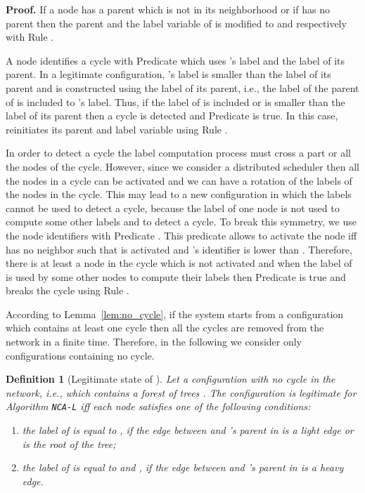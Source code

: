\documentclass[11pt,a4paper]{article}
\newtheorem{definition}{Definition}
\newenvironment{proof}{\noindent \begin{rm}{\textbf{Proof.} }}{\hspace*{\fill}\par\end{rm}}
\newcommand{\LabA}{\mbox{\tt NCA-L}}
\begin{document}
\begin{proof}
If a node  has a parent which is not in its neighborhood or if  has no parent then the parent and the label variable of  is modified to  and  respectively with Rule .

A node  identifies a cycle with Predicate  which uses 's label and the label of its parent. In a legitimate configuration, 's label is smaller than the label of its parent and is constructed using the label of its parent, i.e., the label of the parent of  is included to 's label. Thus, if the label of  is included or is smaller than the label of its parent then a cycle is detected and Predicate  is true. In this case,  reinitiates its parent and label variable using Rule .

In order to detect a cycle the label computation process must cross a part or all the nodes of the cycle. However, since we consider a distributed scheduler then all the nodes in a cycle can be activated and we can have a rotation of the labels of the nodes in the cycle. This may lead to a new configuration in which the labels cannot be used to detect a cycle, because the label of one node is not used to compute some other labels and to detect a cycle. To break this symmetry, we use the node identifiers with Predicate . This predicate allows to activate the node  iff  has no neighbor  such that  is activated and 's identifier is lower than . Therefore, there is at least a node  in the cycle which is not activated and when the label of  is used by some other nodes to compute their labels then Predicate  is true and  breaks the cycle using Rule .
\end{proof}


According to Lemma~\ref{lem:no_cycle}, if the system starts from a configuration which contains at least one cycle then all the cycles are removed from the network in a finite time. Therefore, in the following we consider only configurations containing no cycle.

\begin{definition}[Legitimate state of ]
\label{def:label_legitimate_configuration}
Let  a configuration with no cycle in the network, i.e., which contains a forest of trees . The configuration  is legitimate for Algorithm \LabA\/ iff each node  satisfies one of the following conditions:
\begin{enumerate}
\item the label  of  is equal to , if the edge between  and 's parent in  is a light edge or  is the root of the tree;
\item the label  of  is equal to  and , if the edge between  and 's parent in  is a heavy edge.
\end{enumerate}
\end{definition}
\end{document}

